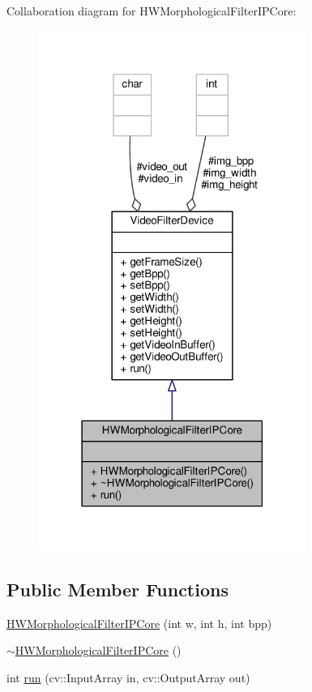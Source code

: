 Collaboration diagram for H\+W\+Morphological\+Filter\+I\+P\+Core\+:
\nopagebreak
\begin{figure}[H]
\begin{center}
\leavevmode
\includegraphics[width=247pt]{classHWMorphologicalFilterIPCore__coll__graph}
\end{center}
\end{figure}
\subsection*{Public Member Functions}
\begin{DoxyCompactItemize}
\item 
\hyperlink{classHWMorphologicalFilterIPCore_a337e6e3fee6b2a054885dd6b44afec9b}{H\+W\+Morphological\+Filter\+I\+P\+Core} (int w, int h, int bpp)
\item 
\hyperlink{classHWMorphologicalFilterIPCore_a9854c8ac2d7402ac9b20381c75678ae9}{$\sim$\+H\+W\+Morphological\+Filter\+I\+P\+Core} ()
\item 
int \hyperlink{classHWMorphologicalFilterIPCore_accac538b601dbc62a61b426b476cf4d0}{run} (cv\+::\+Input\+Array in, cv\+::\+Output\+Array out)
\end{DoxyCompactItemize}
